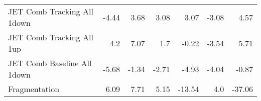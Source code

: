 \begin{table}[htbp]
{\begin{tabular}{lrrrrrr}
JET Comb Tracking All  1down  & -4.44              & 3.68               & 3.08              & 3.07              & -3.08             & 4.57              \\
JET Comb Tracking All  1up    & 4.2                & 7.07               & 1.7               & -0.22             & -3.54             & 5.71              \\
JET Comb Baseline All  1down  & -5.68              & -1.34              & -2.71             & -4.93             & -4.04             & -0.87             \\
Fragmentation                             & 6.09               & 7.71               & 5.15              & -13.54            & 4.0               & -37.06            \\
\end{tabular}}
\end{table}

\clearpage


